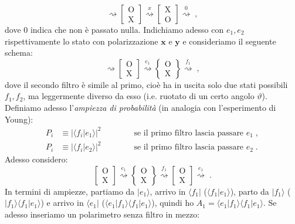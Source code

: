 \documentclass[12pt,a4paper]{report}
\theoremstyle{definition}
\numberwithin{equation}{section}
\newcommand{\bra}{\langle}
\newcommand{\ket}{\rangle}
\begin{document}
$$
\rightsquigarrow \left[
\begin{matrix}
\mathrm{O} \\
\mathrm{X}
\end{matrix}\right]\stackrel{x}{\rightsquigarrow}
\left[\begin{matrix}
\mathrm{X} \\
\mathrm{O}
\end{matrix}\right] \stackrel{0}{\rightsquigarrow}\;,
$$
dove $0$ indica che non è passato nulla. Indichiamo adesso con $e_1,e_2$ rispettivamente lo stato con polarizzazione $\mathbf{x}$ e $\mathbf{y}$ e consideriamo il seguente schema:
$$
\rightsquigarrow \left[
\begin{matrix}
\mathrm{O} \\
\mathrm{X}
\end{matrix}\right] \stackrel{e_1}{\rightsquigarrow}
\left\{ \begin{matrix}
\mathrm{O} \\
\mathrm{X}
\end{matrix}\right\} \stackrel{f_1}{\rightsquigarrow}\;,
$$
dove il secondo filtro è simile al primo, cioè ha in uscita solo due stati possibili $f_1,f_2$, ma leggermente diverso da esso (i.e. ruotato di un certo angolo $\vartheta$). Definiamo adesso l'\textit{ampiezza di probabilità} (in analogia con l'esperimento di Young):
\begin{align}
P_i &\equiv |\bra f_i|e_1\ket|^2 \qquad\qquad \mbox{se il primo filtro lascia passare $e_1$}\;, \\
P_i &\equiv |\bra f_i|e_2\ket|^2 \qquad\qquad \mbox{se il primo filtro lascia passare $e_2$}\;.
\end{align}
Adesso considero:
$$
\left[\begin{matrix}
\mathrm{O} \\
\mathrm{X}
\end{matrix}\right] \stackrel{e_1}{\rightsquigarrow} \left\{
\begin{matrix}
\mathrm{O} \\
\mathrm{X}
\end{matrix}\right\} \stackrel{f_1}{\rightsquigarrow} \left[
\begin{matrix}
\mathrm{O} \\
\mathrm{X}
\end{matrix}\right] \stackrel{e_1}{\rightsquigarrow}\;.
$$
In termini di ampiezze, partiamo da $|e_1\ket$, arrivo in $\bra f_1|$ ($\bra f_1|e_1\ket$), parto da $|f_1\ket$ ($|f_1\ket\bra f_1|e_1\ket$) e arrivo in $\bra e_1|$ ($\bra e_1|f_1\ket\bra f_1|e_1\ket$), quindi ho $A_1=\bra e_1|f_1\ket\bra f_1|e_1\ket$. Se adesso inseriamo un polarimetro senza filtro in mezzo:
\end{document}
